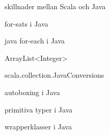 \item skillnader mellan Scala och Java
\item for-sats i Java
\item java for-each i Java
\item ArrayList<Integer>
\item scala.collection.JavaConversions
\item autoboxing i Java
\item primitiva typer i Java
\item wrapperklasser i Java